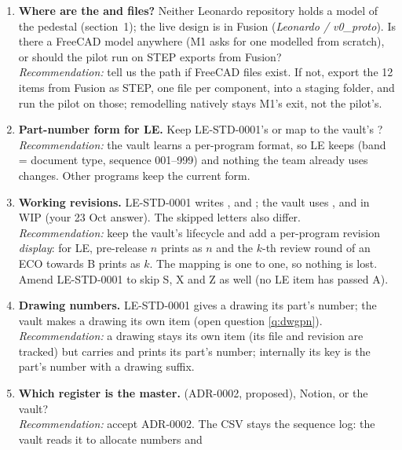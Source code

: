 \begin{enumerate}
  \item \textbf{Where are the  and  files?} Neither Leonardo repository holds a model of
        the pedestal (section~1); the live design is in Fusion (\emph{Leonardo / v0\_proto}). Is there a FreeCAD model
        anywhere (M1 asks for one modelled from scratch), or should the pilot run on STEP exports from Fusion?\\
        \emph{Recommendation:} tell us the path if FreeCAD files exist. If not, export the 12 items from Fusion as STEP,
        one file per component, into a staging folder, and run the pilot on those; remodelling natively stays M1's exit,
        not the pilot's.
  \item \textbf{Part-number form for LE.} Keep LE-STD-0001's  or map to the vault's
        ?\\
        \emph{Recommendation:} the vault learns a per-program format, so LE keeps  (band = document type,
        sequence 001--999) and nothing the team already uses changes. Other programs keep the current form.
  \item \textbf{Working revisions.} LE-STD-0001 writes ,  and ; the vault uses
        ,  and  in WIP (your 23 Oct answer). The skipped letters also differ.\\
        \emph{Recommendation:} keep the vault's lifecycle and add a per-program revision \emph{display}: for LE, pre-release
        $n$ prints as $n$ and the $k$-th review round of an ECO towards B prints as $k$. The
        mapping is one to one, so nothing is lost. Amend LE-STD-0001 to skip S, X and Z as well (no LE item has passed A).
  \item \textbf{Drawing numbers.} LE-STD-0001 gives a drawing its part's number; the vault makes a drawing its own item
        (open question \ref{q:dwgpn}).\\
        \emph{Recommendation:} a drawing stays its own item (its file and revision are tracked) but carries and prints its
        part's number; internally its key is the part's number with a drawing suffix.
  \item \textbf{Which register is the master.}  (ADR-0002, proposed), Notion, or the vault?\\
        \emph{Recommendation:} accept ADR-0002. The CSV stays the sequence log: the vault reads it to allocate numbers and

\end{enumerate}
